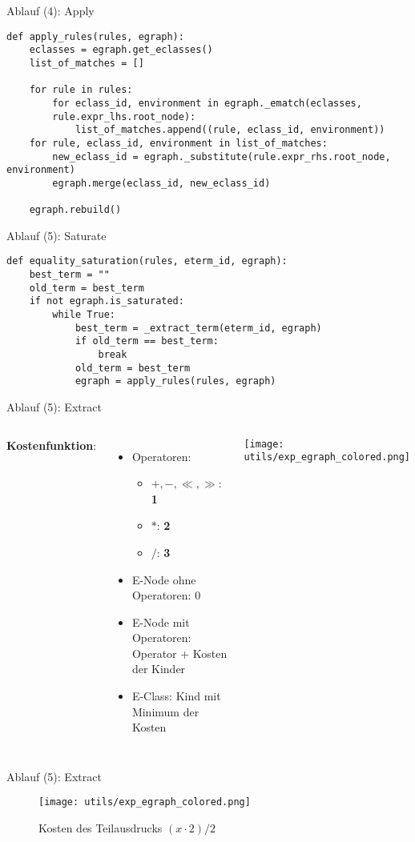 \begin{frame}[fragile]{Ablauf (4): Apply}
\begin{verbatim}    
def apply_rules(rules, egraph):
    eclasses = egraph.get_eclasses()
    list_of_matches = []

    for rule in rules:
        for eclass_id, environment in egraph._ematch(eclasses, 
        rule.expr_lhs.root_node):
            list_of_matches.append((rule, eclass_id, environment))
    for rule, eclass_id, environment in list_of_matches:
        new_eclass_id = egraph._substitute(rule.expr_rhs.root_node, environment)
        egraph.merge(eclass_id, new_eclass_id)
        
    egraph.rebuild()
\end{verbatim}
\end{frame}

\begin{frame}[fragile]{Ablauf (5): Saturate}
\begin{verbatim}    
def equality_saturation(rules, eterm_id, egraph):
    best_term = ""
    old_term = best_term
    if not egraph.is_saturated:
        while True:
            best_term = _extract_term(eterm_id, egraph)
            if old_term == best_term:
                break
            old_term = best_term
            egraph = apply_rules(rules, egraph)     
\end{verbatim}
\end{frame}

\begin{frame}{Ablauf (5): Extract}
    \begin{columns}[c]
            \textbf{Kostenfunktion}:
            \begin{itemize}
                \item Operatoren: \begin{itemize}
                    \item $+, -, \ll, \gg$: \textbf{1}
                    \item $*$: \textbf{2}
                    \item $/$: \textbf{3}
                \end{itemize}
                \item E-Node ohne Operatoren: \colorbox{green-400}{0}
                \item E-Node mit Operatoren: \colorbox{orange-400}{Operator + Kosten der Kinder}
                \item E-Class: \colorbox{blue-300}{Kind mit Minimum der Kosten}
            \end{itemize}
            
            \texttt{[image: utils/exp\_egraph\_colored.png]}
    \end{columns}
\end{frame}

\begin{frame}{Ablauf (5): Extract}
    \begin{figure}[H]
        \centering
        \texttt{[image: utils/exp\_egraph\_colored.png]}
        \caption{Kosten des Teilausdrucks $(x \cdot 2) / 2$}
        \label{fig:exp_egraph_costs}
    \end{figure}
\end{frame}